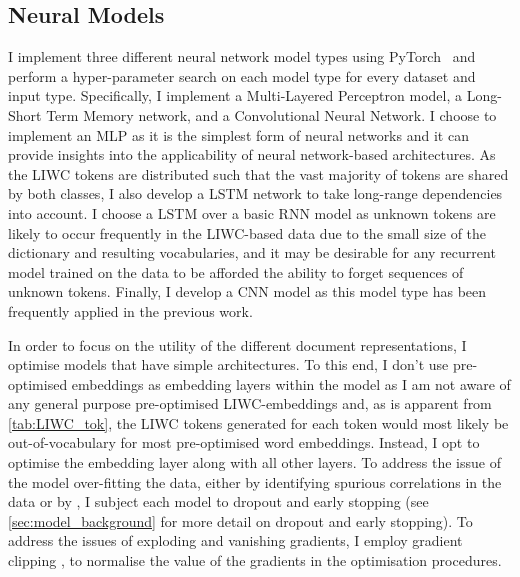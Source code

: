 \subsection{Neural Models}\label{sec:redux_neural}
I implement three different neural network model types using PyTorch~\citep{Paszke:2019} and perform a hyper-parameter search on each model type for every dataset and input type.
Specifically, I implement a Multi-Layered Perceptron model, a Long-Short Term Memory network, and a Convolutional Neural Network.
I choose to implement an MLP as it is the simplest form of neural networks and it can provide insights into the applicability of neural network-based architectures.
As the LIWC tokens are distributed such that the vast majority of tokens are shared by both classes, I also develop a LSTM network to take long-range dependencies into account.
I choose a LSTM over a basic RNN model as unknown tokens are likely to occur frequently in the LIWC-based data due to the small size of the dictionary and resulting vocabularies, and it may be desirable for any recurrent model trained on the data to be afforded the ability to forget sequences of unknown tokens.
Finally, I develop a CNN model as this model type has been frequently applied in the previous work.

In order to focus on the utility of the different document representations, I optimise models that have simple architectures.
To this end, I  don't use pre-optimised embeddings as embedding layers within the model as I am not aware of any general purpose pre-optimised LIWC-embeddings and, as is apparent from \cref{tab:LIWC_tok}, the LIWC tokens generated for each token would most likely be out-of-vocabulary for most pre-optimised word embeddings.
Instead, I opt to optimise the embedding layer along with all other layers.
To address the issue of the model over-fitting the data, either by identifying spurious correlations in the data or by , I subject each model to dropout and early stopping (see \cref{sec:model_background} for more detail on dropout and early stopping).
To address the issues of exploding and vanishing gradients, I employ gradient clipping \citep{Bengio:1994}, to normalise the value of the gradients in the optimisation procedures.


